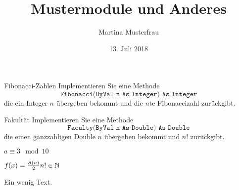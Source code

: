 \documentclass[]{abgabe}
\title{Mustermodule und Anderes}
\date{13. Juli 2018}
\author{Martina Musterfrau}
\begin{document}
	\maketitle
	\begin{noornamentex}{Fibonacci-Zahlen}
		Implementieren Sie eine Methode
		\begin{equation*}
			\texttt{Fibonacci(ByVal n As Integer) As Integer}
		\end{equation*}
		die ein Integer $n$ übergeben bekommt und die $n$te Fibonaccizahl zurückgibt.
	\end{noornamentex}

	\begin{ex}{Fakultät}
		Implementieren Sie eine Methode $$\texttt{Faculty(ByVal n As Double) As Double}$$ die einen ganzzahligen Double $n$ übergeben bekommt und $n!$ zurückgibt.
		\begin{subex}
			\item $a\equiv 3\mod 10$
			\item $f(x) =\frac{\mathcal S(n)}{2} n!\in\mathbb{N}$
			\item Ein wenig Text.
		\end{subex}

		
	\end{ex}
\end{document}
